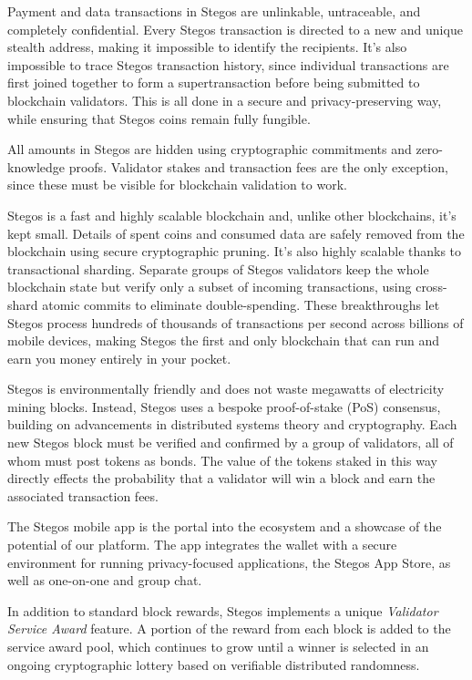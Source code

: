 \documentclass[8pt,fleqn,openany]{book}
\begin{document}
Payment and data transactions in Stegos are unlinkable, untraceable, and completely confidential. Every Stegos transaction is directed to a new and unique stealth address, making it impossible to identify the recipients. It’s also impossible to trace Stegos transaction history, since individual transactions are first joined together to form a supertransaction before being submitted to blockchain validators. This is all done in a secure and privacy-preserving way, while ensuring that Stegos coins remain fully fungible.

All amounts in Stegos are hidden using cryptographic commitments and zero-knowledge proofs. Validator stakes and transaction fees are the only exception, since these must be visible for blockchain validation to work. 

Stegos is a fast and highly scalable blockchain and, unlike other blockchains, it’s kept small. Details of spent coins and consumed data are safely removed from the blockchain using secure cryptographic pruning. It's also highly scalable thanks to transactional sharding. Separate groups of Stegos validators keep the whole blockchain state but verify only a subset of incoming transactions, using cross-shard atomic commits to eliminate double-spending. These breakthroughs let Stegos process hundreds of thousands of transactions per second across billions of mobile devices, making Stegos the first and only blockchain that can run and earn you money entirely in your pocket.

Stegos is environmentally friendly and does not waste megawatts of electricity mining blocks. Instead, Stegos uses a bespoke proof-of-stake (PoS) consensus, building on advancements in distributed systems theory and cryptography. Each new Stegos block must be verified and confirmed by a group of validators, all of whom must post tokens as bonds. The value of the tokens staked in this way directly effects the probability that a validator will win a block and earn the associated transaction fees. 

The Stegos mobile app is the portal into the ecosystem and a showcase of the potential of our platform. The app integrates the wallet with a secure environment for running privacy-focused applications, the Stegos App Store, as well as one-on-one and group chat.

In addition to standard block rewards, Stegos implements a unique \textit{Validator Service Award} feature. A portion of the reward from each block is added to the service award pool, which continues to grow until a winner is selected in an ongoing cryptographic lottery based on verifiable distributed randomness. 
\end{document}
